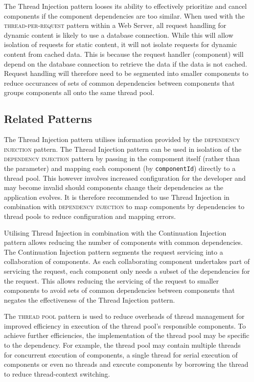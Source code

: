 \documentclass[prodmode]{style/acmlarge}
\begin{document}
The Thread Injection pattern looses its ability to effectively prioritize and
cancel components if the component dependencies are too similar.  When used with
the \textsc{thread-per-request} pattern within a Web Server, all request
handling for dynamic content is likely to use a database connection.  While this
will allow isolation of requests for static content, it will not isolate
requests for dynamic content from cached data.  This is because the request
handler (component) will depend on the database connection to retrieve the data
if the data is not cached.  Request handling will therefore need to be segmented
into smaller components to reduce occurances of sets of common dependencies
between components that groups components all onto the same thread pool.


\subsection{Related Patterns}

The Thread Injection pattern utilises information provided by the
\textsc{dependency injection} pattern.  The Thread Injection pattern can be used
in isolation of the \textsc{dependency injection} pattern by passing in the
compoment itself (rather than the parameter) and mapping each component (by
\texttt{componentId}) directly to a thread pool.  This however involves
increased configuration for the developer and may become invalid should
components change their dependencies as the application evolves.  It is
therefore recommended to use Thread Injection in combination with
\textsc{dependency injection} to map components by dependencies to thread pools
to reduce configuration and mapping errors.

Utilising Thread Injection in combination with the Continuation Injection
pattern allows reducing the number of components with common dependencies.  The
Continuation Injection pattern segments the request servicing into a
collaboration of components.  As each collaborating component undertakes part of
servicing the request, each component only needs a subset of the dependencies
for the request.  This allows reducing the servicing of the request to smaller
components to avoid sets of common dependencies between components that negates
the effectiveness of the Thread Injection pattern.

The \textsc{thread pool} pattern \cite{thread-per-request} is used to reduce
overheads of thread management for improved efficiency in execution of the
thread pool's responsible components.  To achieve further efficiencies, the
implementation of the thread pool may be specific to the dependency.  For
example, the thread pool may contain multiple threads for concurrent execution
of components, a single thread for serial execution of components or even no
threads and execute components by borrowing the thread to reduce thread-context
switching.
\end{document}

